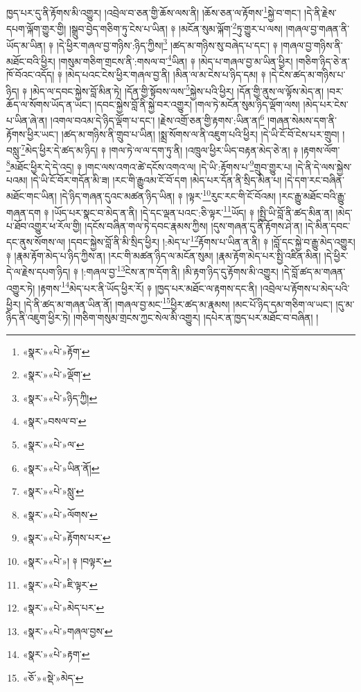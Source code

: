 ཁྱད་པར་དུ་ནི་རྟོགས་མི་འགྱུར། །འབྲེལ་བ་ཅན་གྱི་ཆོས་ལས་ནི། །ཆོས་ཅན་ལ་རྟོགས་\footnote{«སྣར་»«པེ་»རྟོག་}སྐྱེ་བ་གང་། །དེ་ནི་རྗེས་དཔག་ལྐོག་གྱུར་གྱི། །སྒྲུབ་བྱེད་གཅིག་ཏུ་ངེས་པ་ཡིན། ༈ །མངོན་སུམ་ལྐོག་\footnote{«སྣར་»«པེ་»ལྡོག་}ཏུ་གྱུར་པ་ལས། །གཞལ་བྱ་གཞན་ནི་ཡོད་མ་ཡིན། ༈ །དེ་ཕྱིར་གཞལ་བྱ་གཉིས་:ཉིད་ཀྱིས།\footnote{«སྣར་»«པེ་»ཉིད་ཀྱི།} །ཚད་མ་གཉིས་སུ་བཞེད་པ་དང་། ༈ །གཞལ་བྱ་གཉིས་ནི་མཐོང་བའི་ཕྱིར། །གསུམ་གཅིག་གྲངས་ནི་:གསལ་བ་\footnote{«སྣར་»བསལ་བ་}ཡིན། ༈ །མེད་པ་གཞལ་བྱ་མ་ཡིན་ཕྱིར། །གཅིག་ཉིད་ཅེ་ན་ཁོ་བོའང་འདོད། ༈ །མེད་པའང་ངེས་ཕྱིར་གཞལ་བྱ་ནི། །མིན་ལ་མ་ངེས་པ་ཉིད་དམ། ༈ །དེ་ངེས་ཚད་མ་གཉིས་པ་ཉིད། ༈ །མེད་ལ་དབང་སྐྱེས་བློ་མིན་ཏེ། །དོན་གྱི་སྟོབས་ལས་\footnote{«སྣར་»«པེ་»ལ་}སྐྱེས་པའི་ཕྱིར། །དོན་གྱི་ནུས་ལ་ལྟོས་མེད་ན། །བར་ཆོད་ལ་སོགས་ཡོད་ན་ཡང་། །དབང་སྐྱེས་བློ་ནི་སྐྱེ་བར་འགྱུར། །གལ་ཏེ་མངོན་སུམ་ཉིད་ལྡོག་ལས། །མེད་པར་ངེས་པ་ཡིན་ཞེ་ན། །འགལ་བའམ་དེ་ཉིད་ལྡོག་པ་དང་། །རྗེས་འགྲོ་ཅན་གྱི་རྟགས་:ཡིན་ན།\footnote{«སྣར་»«པེ་»ཡིན་ནོ།} །གཞན་སེམས་དག་ནི་རྟོགས་ཕྱིར་ཡང་། །ཚད་མ་གཉིས་ནི་གྲུབ་པ་ཡིན། །སྨྲ་སོགས་ལ་ནི་འཇུག་པའི་ཕྱིར། །དེ་ཡི་ངོ་བོ་ངེས་པར་གྲུབ། །བསླུ་\footnote{«སྣར་»«པེ་»སླུ་}མེད་ཕྱིར་དེ་ཚད་མ་ཉིད། ༈ །གལ་ཏེ་ལ་ལ་དག་ཏུ་ནི། །འཁྲུལ་ཕྱིར་ཡིད་བརྟན་མེད་ཅེ་ན། ༈ །རྟགས་ལོག་\footnote{«སྣར་»«པེ་»ལོགས་}མཐོང་ཕྱིར་དེ་དེ་འདྲ། ༈ །གང་ལས་འགའ་ཚེ་དངོས་འགའ་ལ། །དེ་ཡི་:རྟོགས་པ་\footnote{«སྣར་»«པེ་»རྟོགས་པར་}གྲུབ་གྱུར་པ། །དེ་ནི་དེ་ལས་སྐྱེས་པའམ། །དེ་ཡི་ངོ་བོར་གདོན་མི་ཟ། །རང་གི་རྒྱུའམ་ངོ་བོ་དག །མེད་པར་དོན་ནི་སྲིད་མིན་པ། །དེ་དག་རང་བཞིན་མཐོང་གང་ཡིན། །དེ་ཉིད་གཞན་དུའང་མཚན་ཉིད་ཡིན། ༈ །ལྟར་\footnote{«སྣར་»«པེ་»། ༈ །བལྟར་}རུང་རང་གི་ངོ་བོའམ། །རང་རྒྱུ་མཐོང་བའི་རྒྱུ་གཞན་དག ༈ །ཡོད་པར་སྣང་བ་མེད་ན་ནི། །དེ་དང་ལྡན་པའང་:ཅི་ལྟར་\footnote{«སྣར་»«པེ་»ཇི་ལྟར་}ཡོད། ༈ །སྤྱི་ཡི་བློ་ནི་ཚད་མིན་ན། །མེད་པ་ཐོབ་འགྱུར་ཕ་རོལ་གྱི། །དངོས་བཞིན་གལ་ཏེ་དབང་རྣམས་ཀྱིས། །དུས་གཞན་དུ་ནི་རྟོགས་ཤེ་ན། །དེ་མིན་དབང་དང་ནུས་སོགས་ལ། །དབང་སྐྱེས་བློ་ནི་མི་སྲིད་ཕྱིར། །:མེད་པ་\footnote{«སྣར་»«པེ་»མེད་པར་}རྟོགས་པ་ཡིན་ན་ནི། ༈ །བློ་དང་སྐྱེ་བ་རྒྱུ་མེད་འགྱུར། ༈ །རྣམ་རྟོག་མེད་པ་ཉིད་ཀྱིས་ན། །རང་གི་མཚན་ཉིད་ལ་མངོན་སུམ། །རྣམ་རྟོག་མེད་པར་སྤྱི་འཛིན་མིན། །དེ་ཕྱིར་དེ་ལ་རྗེས་དཔག་ཉིད། ༈ །:གཞལ་བྱ་\footnote{«སྣར་»«པེ་»གཞལ་བྱས་}ངེས་ན་ཁ་དོག་ནི། །མི་རྟག་ཉིད་དུ་རྟོགས་མི་འགྱུར། །དེ་བློ་ཚད་མ་གཞན་འགྱུར་ཏེ། །རྟགས་\footnote{«སྣར་»«པེ་»རྟག་}མེད་པར་ནི་ཡོད་ཕྱིར་རོ། ༈ །ཁྱད་པར་མཐོང་ལ་རྟགས་དང་ནི། །འབྲེལ་པ་རྟོགས་པ་མེད་པའི་ཕྱིར། །དེ་ནི་ཚད་མ་གཞན་ཡིན་ནོ། །གཞལ་བྱ་མང་\footnote{«ཅོ་»«སྡེ་»མེད་}ཕྱིར་ཚད་མ་རྣམས། །མང་པོ་ཉིད་དམ་གཅིག་ལ་ཡང་། །དུ་མ་ཉིད་ནི་འཇུག་ཕྱིར་ཏེ། །གཅིག་གསུམ་གྲངས་ཀྱང་སེལ་མི་འགྱུར། །དཔེར་ན་ཁྱད་པར་མཐོང་བ་བཞིན། །
